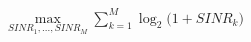 \documentclass[preview]{standalone}
\begin{document}
\begin{align*}
\max_{SINR_1, ...,SINR_M} \sum_{k=1}^{M} \log_2 \Bigg( 1 + SINR_k \Bigg)
\end{align*}
\end{document}
